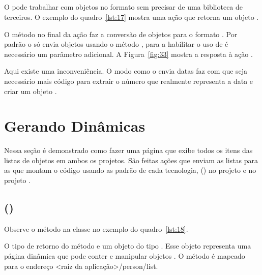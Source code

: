 \subsection{}

O  pode trabalhar com objetos no formato  sem precisar de uma biblioteca de terceiros. O exemplo do quadro~\ref{lst:17} mostra uma ação que retorna um objeto .


O método  no final da ação faz a conversão de objetos para o formato . Por padrão o  só envia objetos  usando o método , para a habilitar o uso de  é necessário um parâmetro adicional. A Figura~\ref{fig:33} mostra a resposta à ação .


Aqui existe uma inconveniência. O modo como o  envia datas faz com que seja necessário mais código  para extrair o número que realmente representa a data e criar um objeto .

\section{Gerando  Dinâmicas}

Nessa seção é demonstrado como fazer uma página que exibe todos os itens das listas de objetos  em ambos os projetos. São feitas ações que enviam as listas para as  que montam o código  usando as  padrão de cada tecnologia,  () no projeto  e  no projeto .

\subsection{ ()}

Observe o método  na classe  no exemplo do quadro~\ref{lst:18}.


O tipo de retorno do método  e um objeto do tipo . Esse objeto representa uma página dinâmica que pode conter e manipular objetos . O método é mapeado para o endereço <raiz da aplicação>/person/list. 

